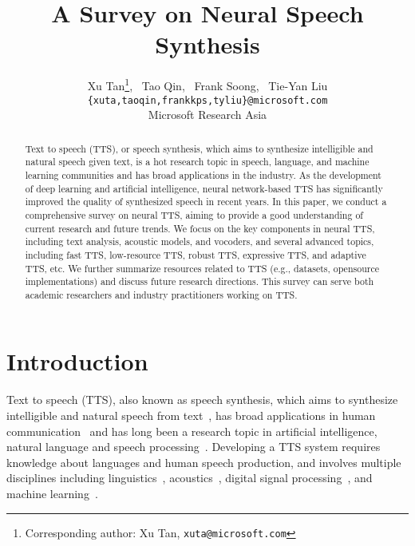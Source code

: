 \documentclass{article}
\title{A Survey on Neural Speech Synthesis}
\author{
Xu Tan\thanks{Corresponding author: Xu Tan, \texttt{xuta@microsoft.com}}, ~Tao Qin, ~Frank Soong, ~Tie-Yan Liu \\
\texttt{\{xuta,taoqin,frankkps,tyliu\}@microsoft.com} \\
Microsoft Research Asia \\
}
\begin{document}
\maketitle

\begin{abstract}
Text to speech (TTS), or speech synthesis, which aims to synthesize intelligible and natural speech given text, is a hot research topic in speech, language, and machine learning communities and has broad applications in the industry. As the development of deep learning and artificial intelligence, neural network-based TTS has significantly improved the quality of synthesized speech in recent years. In this paper, we conduct a comprehensive survey on neural TTS, aiming to provide a good understanding of current research and future trends. We focus on the key components in neural TTS, including text analysis, acoustic models, and vocoders, and several advanced topics, including fast TTS, low-resource TTS, robust TTS, expressive TTS, and adaptive TTS, etc. We further summarize resources related to TTS (e.g., datasets, opensource implementations) and discuss future research directions. This survey can serve both academic researchers and industry practitioners working on TTS. 
\end{abstract}


\section{Introduction}
Text to speech (TTS), also known as speech synthesis, which aims to synthesize intelligible and natural speech from text~\cite{taylor2009text}, has broad applications in human communication~\cite{adler1991understanding} and has long been a research topic in artificial intelligence, natural language and speech processing~\cite{russell2002artificial,manning1999foundations,jurafsky2000speech}. Developing a TTS system requires knowledge about languages and human speech production, and involves multiple disciplines including linguistics~\cite{de2011course}, acoustics~\cite{kinsler1999fundamentals}, digital signal processing~\cite{stanley1988digital}, and machine learning~\cite{bishop2006pattern,jordan2015machine}. 
\end{document}
